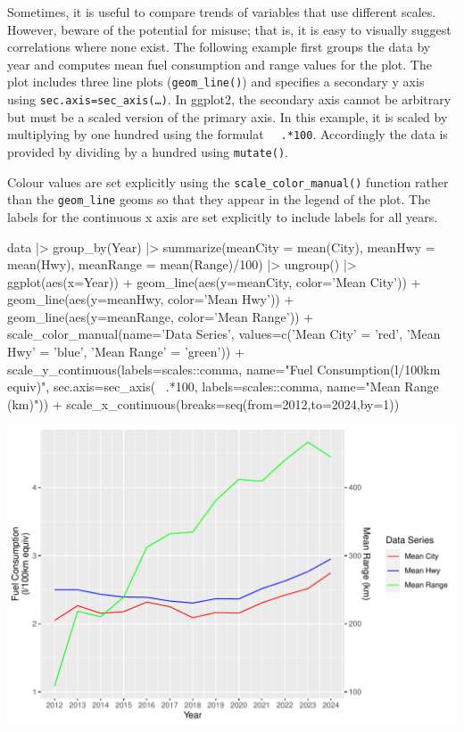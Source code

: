 Sometimes, it is useful to compare trends of variables that use different scales. However, beware of the potential for misuse; that is, it is easy to visually suggest correlations where none exist. The following example first groups the data by year and computes mean fuel consumption and range values for the plot. The plot includes three line plots (\texttt{geom\_line()}) and specifies a secondary y axis using \texttt{sec.axis=sec\_axis(\ldots)}. In ggplot2, the secondary axis cannot be arbitrary but must be a scaled version of the primary axis. In this example, it is scaled by multiplying by one hundred using the formulat \texttt{~ .*100}. Accordingly the data is provided by dividing by a hundred using \texttt{mutate()}. 

Colour values are set explicitly using the \texttt{scale\_color\_manual()} function rather than the \texttt{geom\_line} geoms so that they appear in the legend of the plot. The labels for the continuous x axis are set explicitly to include labels for all years. 

\begin{Rcode}
data |>
   group_by(Year) |>
   summarize(meanCity = mean(City), 
             meanHwy = mean(Hwy), 
             meanRange = mean(Range)/100) |>
   ungroup() |>
ggplot(aes(x=Year)) +
  geom_line(aes(y=meanCity, color='Mean City')) + 
  geom_line(aes(y=meanHwy, color='Mean Hwy')) +
  geom_line(aes(y=meanRange, color='Mean Range')) +
  scale_color_manual(name='Data Series', 
     values=c('Mean City' = 'red', 
              'Mean Hwy' = 'blue', 
              'Mean Range' = 'green')) +
  scale_y_continuous(labels=scales::comma, 
      name="Fuel Consumption\n(l/100km equiv)", 
      sec.axis=sec_axis(~ .*100, 
                        labels=scales::comma, 
                        name="Mean Range (km)")) + 
  scale_x_continuous(breaks=seq(from=2012,to=2024,by=1))
\end{Rcode}

\begin{center}
  \includegraphics[width=.8\textwidth]{fuel.linesTwoScales.pdf}
\end{center}

